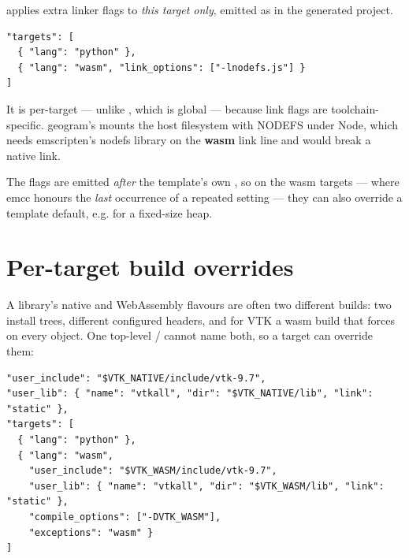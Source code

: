  applies extra linker flags to \emph{this target only},
emitted as  in the generated
project.

\begin{lstlisting}[style=json]
"targets": [
  { "lang": "python" },
  { "lang": "wasm", "link_options": ["-lnodefs.js"] }
]
\end{lstlisting}

It is per-target --- unlike , which is global ---
because link flags are toolchain-specific. geogram's 
mounts the host filesystem with NODEFS under Node, which needs emscripten's
nodefs library on the \textbf{wasm} link line and would break a native link.

The flags are emitted \emph{after} the template's own
, so on the wasm targets --- where emcc honours the
\emph{last} occurrence of a repeated  setting --- they can also
override a template default, e.g.  for a
fixed-size heap.

\section{Per-target build overrides}
\label{sec:targetbuild}

A library's native and WebAssembly flavours are often two different builds:
two install trees, different configured headers, and for VTK a wasm build that
forces  on every object. One top-level
 /  cannot name both, so a target can
override them:

\begin{lstlisting}[style=json]
"user_include": "$VTK_NATIVE/include/vtk-9.7",
"user_lib": { "name": "vtkall", "dir": "$VTK_NATIVE/lib", "link": "static" },
"targets": [
  { "lang": "python" },
  { "lang": "wasm",
    "user_include": "$VTK_WASM/include/vtk-9.7",
    "user_lib": { "name": "vtkall", "dir": "$VTK_WASM/lib", "link": "static" },
    "compile_options": ["-DVTK_WASM"],
    "exceptions": "wasm" }
]
\end{lstlisting}

